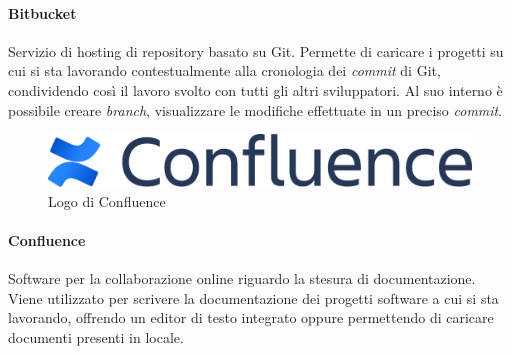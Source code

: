\paragraph{Bitbucket} Servizio di hosting di repository basato su Git. Permette di caricare i progetti su cui si sta lavorando contestualmente alla cronologia dei \emph{commit} di Git, condividendo così il lavoro svolto con tutti gli altri sviluppatori. Al suo interno è possibile creare \emph{branch}, visualizzare le modifiche effettuate in un preciso \emph{commit}.

\vspace{6mm}

\begin{figure}[H]
    \centering 
    \includegraphics[width=0.5\columnwidth]{images/loghi/confluence.png} 
    \caption{Logo di Confluence}
\end{figure}

\paragraph{Confluence} Software per la collaborazione online riguardo la stesura di documentazione. Viene utilizzato per scrivere la documentazione dei progetti software a cui si sta lavorando, offrendo un editor di testo integrato oppure permettendo di caricare documenti presenti in locale.


